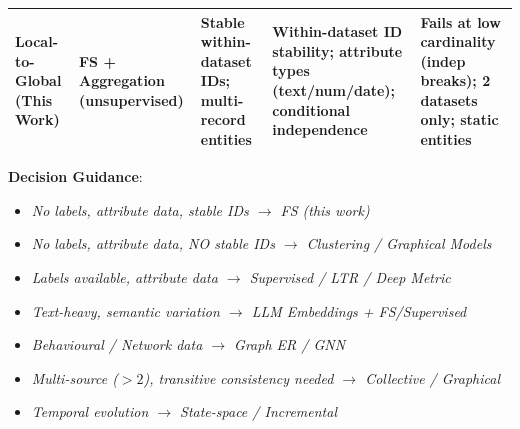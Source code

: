 \begin{longtable}{p{2.5cm}p{2.5cm}p{3.5cm}p{3.5cm}p{3.5cm}}
	Local-to-Global (This Work)                      & FS + Aggregation (unsupervised)      & Stable within-dataset IDs; multi-record entities                     & Within-dataset ID stability; attribute types (text/num/date); conditional independence & Fails at low cardinality (indep breaks); 2 datasets only; static entities                        \\

	\bottomrule
\end{longtable}

\textbf{Decision Guidance}:
\begin{itemize}
	\item \textit{No labels, attribute data, stable IDs $\to$ FS (this work)}
	\item \textit{No labels, attribute data, NO stable IDs $\to$ Clustering / Graphical Models}
	\item \textit{Labels available, attribute data $\to$ Supervised / LTR / Deep Metric}
	\item \textit{Text-heavy, semantic variation $\to$ LLM Embeddings + FS/Supervised}
	\item \textit{Behavioural / Network data $\to$ Graph ER / GNN}
	\item \textit{Multi-source ($>2$), transitive consistency needed $\to$ Collective / Graphical}
	\item \textit{Temporal evolution $\to$ State-space / Incremental}
\end{itemize}